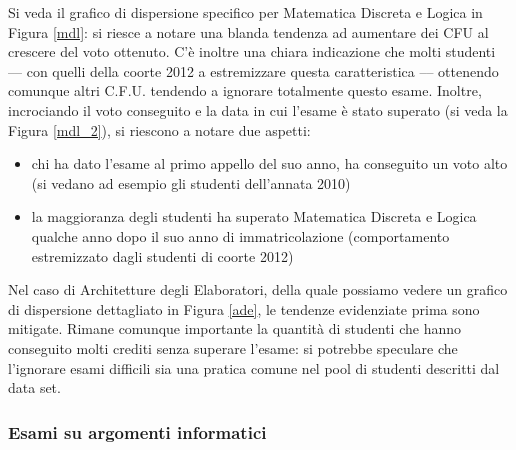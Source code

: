                 Si veda il grafico di dispersione specifico per Matematica Discreta e Logica in Figura \ref{mdl}: si riesce a notare una blanda tendenza ad aumentare dei CFU al crescere del voto ottenuto. C’è inoltre una chiara indicazione che molti studenti –-- con quelli della coorte 2012 a estremizzare questa caratteristica –-- ottenendo comunque altri C.F.U. tendendo a ignorare totalmente questo esame. Inoltre, incrociando il voto conseguito e la data in cui l’esame è stato superato (si veda la Figura \ref{mdl_2}), si riescono a notare due aspetti:

                \begin{itemize}
                    \item chi ha dato l’esame al primo appello del suo anno, ha conseguito un voto alto (si vedano ad esempio gli studenti dell’annata 2010)
                    \item la maggioranza degli studenti ha superato Matematica Discreta e Logica qualche anno dopo il suo anno di immatricolazione (comportamento estremizzato dagli studenti di coorte 2012)
                \end{itemize}

                Nel caso di Architetture degli Elaboratori, della quale possiamo vedere un grafico di dispersione dettagliato in Figura \ref{ade}, le tendenze evidenziate prima sono mitigate. Rimane comunque importante la quantità di studenti che hanno conseguito molti crediti senza superare l’esame: si potrebbe speculare che l’ignorare esami difficili sia una pratica comune nel pool di studenti descritti dal data set.

            \subsubsection{Esami su argomenti informatici}

